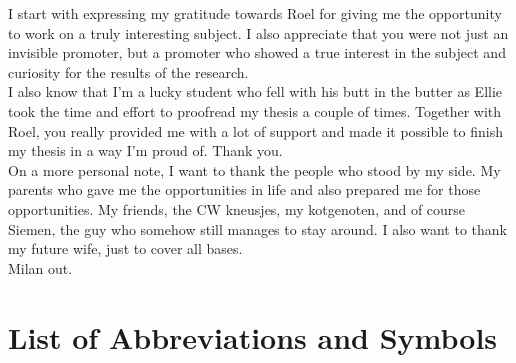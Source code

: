 \documentclass[master=ecws,masteroption=ai]{kulemt}
\begin{document}
\begin{preface}
 
I start with expressing my gratitude towards Roel for giving me the opportunity to work on a truly interesting subject. I also appreciate that you were not just an invisible promoter, but a promoter who showed a true interest in the subject and curiosity for the results of the research. \\
I also know that I'm a lucky student who fell with his butt in the butter as Ellie took the time and effort to proofread my thesis a couple of times. Together with Roel, you really provided me with a lot of support and made it possible to finish my thesis in a way I'm proud of. Thank you. \\
On a  more personal note, I want to thank the people who stood by my side. My parents who gave me the opportunities in life and also prepared me for those opportunities. My friends, the CW kneusjes, my kotgenoten, and of course Siemen, the guy who somehow still manages to stay around. I also want to thank my future wife, just to cover all bases. \\

\noindent Milan out.
 
\end{preface}

\tableofcontents*

\begin{abstract}

  \lipsum[1]
\end{abstract}

\listoffiguresandtables
\chapter{List of Abbreviations and Symbols}
\end{document}
